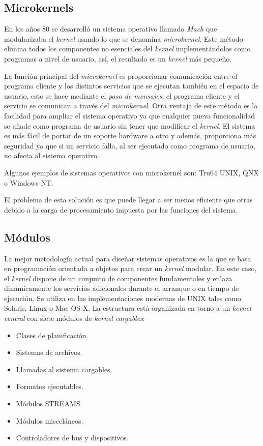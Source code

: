 \documentclass[10pt,a4paper,spanish]{report}
\begin{document}
  \subsection{Microkernels}
  \noindent
  En los años 80 se desarrolló un sistema operativo llamado \textit{Mach} que modularizaba el \textit{kernel} usando lo que se denomina \textit{microkernel}. Este método elimina todos los componentes no esenciales del \textit{kernel} implementándolos como programas a nivel de usuario, así, el resultado es un \textit{kernel} más pequeño.

  \noindent
  La función principal del \textit{microkernel} es proporcionar comunicación entre el programa cliente y los distintos servicios que se ejecutan también en el espacio de usuario, esto se hace mediante el \textit{paso de mensajes}: el programa cliente y el servicio se comunican a través del \textit{microkernel}. Otra ventaja de este método es la facilidad para ampliar el sistema operativo ya que cualquier nueva funcionalidad se añade como programa de usuario sin tener que modificar el \textit{kernel}. El sistema es más fácil de portar de un soporte hardware a otro y además, proporciona más seguridad ya que si un servicio falla, al ser ejecutado como programa de usuario, no afecta al sistema operativo.

  \noindent
  Algunos ejemplos de sistemas operativos con microkernel son: Tru64 UNIX, QNX o Windows NT.

  \noindent
  El problema de esta solución es que puede llegar a ser menos eficiente que otras debido a la carga de procesamiento impuesta por las funciones del sistema.

  \subsection{Módulos}
  \noindent
  La mejor metodología actual para diseñar sistemas operativos es la que se basa en programación orientada a objetos para crear un \textit{kernel} modular. En este caso, el \textit{kernel} dispone de un conjunto de componentes fundamentales y enlaza dinámicamente los servicios adicionales durante el arranque o en tiempo de ejecución. Se utiliza en las implementaciones modernas de UNIX tales como Solaris, Linux o Mac OS X. La estructura está organizada en torno a un \textit{kernel central} con siete módulos de \textit{kernel cargables}:
  \begin{itemize}
    \item Clases de planificación.
    \item Sistemas de archivos.
    \item Llamadas al sistema cargables.
    \item Formatos ejecutables.
    \item Módulos STREAMS.
    \item Módulos misceláneos.
    \item Controladores de bus y dispositivos.
  \end{itemize}
\end{document}

